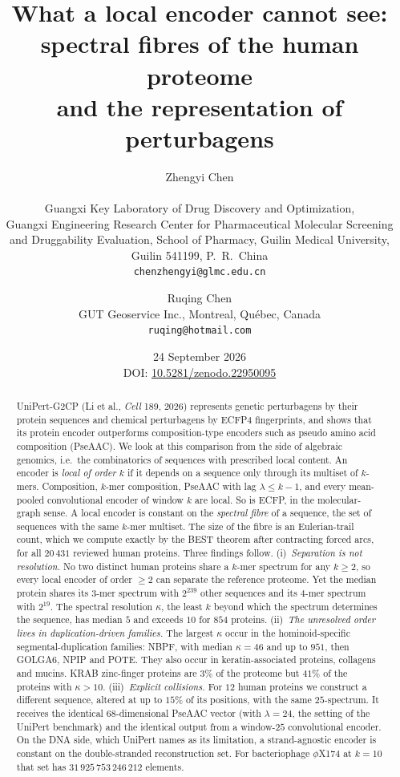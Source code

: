 \documentclass[11pt]{article}
\title{\bfseries What a local encoder cannot see:\\ spectral fibres of the human proteome\\
and the representation of perturbagens}
\author{Zhengyi Chen\\[2pt]
\normalsize\begin{tabular}{c}
Guangxi Key Laboratory of Drug Discovery and Optimization,\\
Guangxi Engineering Research Center for Pharmaceutical Molecular Screening\\
and Druggability Evaluation, School of Pharmacy, Guilin Medical University,\\
Guilin 541199, P.~R.~China\\
\texttt{chenzhengyi@glmc.edu.cn}
\end{tabular}
\and
Ruqing Chen\\[2pt]
\normalsize GUT Geoservice Inc., Montreal, Qu\'ebec, Canada\\
\normalsize\texttt{ruqing@hotmail.com}}
\date{24 September 2026\\[4pt]\small DOI: \href{https://doi.org/10.5281/zenodo.22950095}{10.5281/zenodo.22950095}}
\theoremstyle{plain}
\theoremstyle{definition}
\theoremstyle{remark}
\begin{document}
\maketitle

\begin{abstract}
\noindent
UniPert-G2CP (Li et al., \emph{Cell} 189, 2026) represents genetic perturbagens by their protein
sequences and chemical perturbagens by ECFP4 fingerprints, and shows that its protein encoder
outperforms composition-type encoders such as pseudo amino acid composition (PseAAC). We look at
this comparison from the side of algebraic genomics, i.e.\ the combinatorics of sequences with
prescribed local content. An encoder is \emph{local of order $k$} if it depends on a sequence only
through its multiset of $k$-mers. Composition, $k$-mer composition, PseAAC with lag $\lambda\le k-1$,
and every mean-pooled convolutional encoder of window $k$ are local. So is ECFP, in the
molecular-graph sense. A local encoder is constant on the \emph{spectral fibre} of a sequence, the
set of sequences with the same $k$-mer multiset. The size of the fibre is an Eulerian-trail count,
which we compute exactly by the BEST theorem after contracting forced arcs, for all $20\,431$
reviewed human proteins. Three findings follow.
(i)~\emph{Separation is not resolution.} No two distinct human proteins share a $k$-mer spectrum
for any $k\ge2$, so every local encoder of order $\ge2$ can separate the reference proteome. Yet the
median protein shares its $3$-mer spectrum with $2^{239}$ other sequences and its $4$-mer spectrum
with $2^{19}$. The spectral resolution $\kappa$, the least $k$ beyond which the spectrum determines
the sequence, has median $5$ and exceeds $10$ for $854$ proteins.
(ii)~\emph{The unresolved order lives in duplication-driven families.} The largest $\kappa$ occur in
the hominoid-specific segmental-duplication families: NBPF, with median $\kappa=46$ and up to $951$,
then GOLGA6, NPIP and POTE. They also occur in keratin-associated proteins, collagens and mucins.
KRAB zinc-finger proteins are $3\%$ of the proteome but $41\%$ of the proteins with $\kappa>10$.
(iii)~\emph{Explicit collisions.} For $12$ human proteins we construct a different sequence, altered at
up to $15\%$ of its positions, with the same $25$-spectrum. It receives the identical $68$-dimensional
PseAAC vector (with $\lambda=24$, the setting of the UniPert benchmark) and the identical output from a
window-$25$ convolutional encoder. On the DNA side, which UniPert names as its limitation, a
strand-agnostic encoder is constant on the double-stranded reconstruction set. For bacteriophage
$\phi$X174 at $k=10$ that set has $31\,925\,753\,246\,212$ elements.
\end{abstract}
\end{document}
